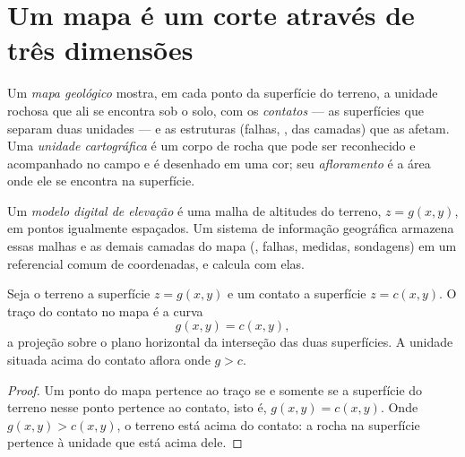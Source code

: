 \section{Um mapa é um corte através de três dimensões}\label{sec:b1:geological-maps:cut}

\begin{definition}\label{def:b1:geological-maps:geological-map}
Um \emph{mapa geológico} mostra, em cada ponto da superfície do terreno, a unidade rochosa que ali se encontra sob o solo, com os \emph{contatos} --- as superfícies que separam duas unidades --- e as estruturas (falhas, ,  das camadas) que as afetam. Uma \emph{unidade cartográfica} é um corpo de rocha que pode ser reconhecido e acompanhado no campo e é desenhado em uma cor; seu \emph{afloramento} é a área onde ele se encontra na superfície.
\end{definition}

\begin{definition}\label{def:b1:geological-maps:dem}
Um \emph{modelo digital de elevação} é uma malha de altitudes do terreno, $z = g(x,y)$, em pontos igualmente espaçados. Um sistema de informação geográfica armazena essas malhas e as demais camadas do mapa (, falhas, medidas, sondagens) em um referencial comum de coordenadas, e calcula com elas.
\end{definition}

\begin{proposition}\label{prop:b1:geological-maps:intersection}
Seja o terreno a superfície $z = g(x,y)$ e um contato a superfície
$z = c(x,y)$. O traço do contato no mapa é a curva
\[
  g(x,y) = c(x,y),
\]
a projeção sobre o plano horizontal da interseção das duas superfícies. A unidade situada acima do contato aflora onde $g > c$.
\end{proposition}

\begin{proof}
Um ponto do mapa pertence ao traço se e somente se a superfície do terreno nesse ponto pertence ao contato, isto é, $g(x,y) = c(x,y)$. Onde $g(x,y) > c(x,y)$, o terreno está acima do contato: a rocha na superfície pertence à unidade que está acima dele.
\end{proof}

